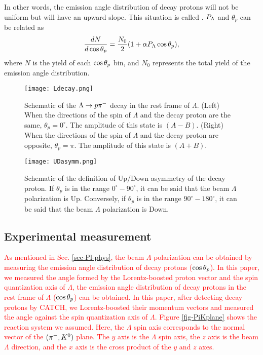 In other words, the emission angle distribution of decay protons will not be uniform but will have an upward slope. This situation is called . $P_{\Lambda}$ and $\theta_{p}$ can be related as 
\begin{equation}
  \frac{dN}{d\cos{\theta_p}} = \frac{N_0}{2}(1+\alpha P_{\Lambda}\cos{\theta_p}), 
  \label{eq-costp}
\end{equation}
where $N$ is the yield of each $\cos{\theta_p}$ bin, and $N_0$ represents the total yield of the emission angle distribution. %

\begin{figure}[h]
  \centering
  \texttt{[image: Ldecay.png]}
  \caption{Schematic of the $\Lambda\to p\pi^{-}$ decay in the rest frame of $\Lambda$. (Left) When the directions of the spin of $\Lambda$ and the decay proton are the same, $\theta_{p}=0^{\circ}$. The amplitude of this state is $(A-B)$. (Right) When the directions of the spin of $\Lambda$ and the decay proton are opposite, $\theta_{p}=\pi$. The amplitude of this state is $(A+B)$.}
  \label{fig-Ldecay}
\end{figure}

\begin{figure}[h]
  \centering
  \texttt{[image: UDasymm.png]}
  \caption{Schematic of the definition of Up/Down asymmetry of the decay proton. If $\theta_{p}$ is in the range $0^{\circ}-90^{\circ}$, it can be said that the beam $\Lambda$ polarization is Up. Conversely, if $\theta_{p}$ is in the range $90^{\circ}-180^{\circ}$, it can be said that the beam $\Lambda$ polarization is Down.}
  \label{fig-UDasymm}
\end{figure}


\subsection{Experimental measurement}

\textcolor{red}{ As mentioned in Sec. \ref{sec-Pl-phys}, the beam $\Lambda$ polarization can be obtained by measuring the emission angle distribution of decay protons ($\cos{\theta_p}$). In this paper, we measured the angle formed by the Lorentz-boosted proton vector and the spin quantization axis of $\Lambda$, the emission angle distribution of decay protons in the rest frame of $\Lambda$ ($\cos{\theta_p}$) can be obtained. In this paper, after detecting decay protons by CATCH, we Lorentz-boosted their momentum vectors and measured the angle against the spin quantization axis of $\Lambda$. Figure \ref{fig-PiKplane} shows the reaction system we assumed. Here, the $\Lambda$ spin axis corresponds to the normal vector of the $(\pi^-,K^0)$ plane. The $y$ axis is the $\Lambda$ spin axis, the $z$ axis is the beam $\Lambda$ direction, and the $x$ axis is the cross product of the $y$ and $z$ axes. }


